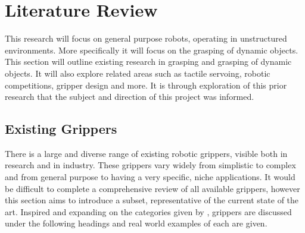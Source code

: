 \chapter{Literature Review}\label{LitReview}

This research will focus on general purpose robots, operating in unstructured environments. More specifically it will focus on the grasping of dynamic objects. This section will outline existing research in grasping and grasping of dynamic objects. It will also explore related areas such as tactile servoing, robotic competitions, gripper design and more. It is through exploration of this prior research that the subject and direction of this project was informed.

\section{Existing Grippers}

There is a large and diverse range of existing robotic grippers, visible both in research and in industry. These grippers vary widely from simplistic to complex and from general purpose to having a very specific, niche applications. It would be difficult to complete a comprehensive review of all available grippers, however this section aims to introduce a subset, representative of the current state of the art. Inspired and expanding on the categories given by \cite{APCinhandproxandcontact}, grippers are discussed under the following headings and real world examples of each are given.


